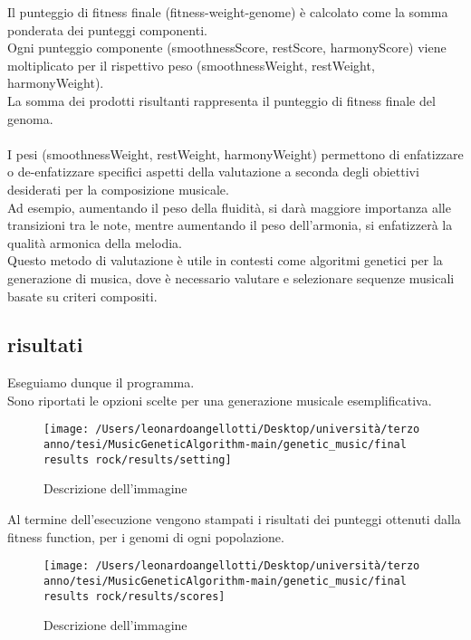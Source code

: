 \documentclass[a4paper,12pt]{report}
\begin{document}
Il punteggio di fitness finale (fitness-weight-genome) è calcolato come la somma ponderata dei punteggi componenti. \\
Ogni punteggio componente (smoothnessScore, restScore, harmonyScore) viene moltiplicato per il rispettivo peso (smoothnessWeight, restWeight, harmonyWeight). \\
La somma dei prodotti risultanti rappresenta il punteggio di fitness finale del genoma. \\
\\
I pesi (smoothnessWeight, restWeight, harmonyWeight) permettono di enfatizzare o de-enfatizzare specifici aspetti della valutazione a seconda degli obiettivi desiderati per la composizione musicale. \\
Ad esempio, aumentando il peso della fluidità, si darà maggiore importanza alle transizioni tra le note, mentre aumentando il peso dell'armonia, si enfatizzerà la qualità armonica della melodia. \\
Questo metodo di valutazione è utile in contesti come algoritmi genetici per la generazione di musica, dove è necessario valutare e selezionare sequenze musicali basate su criteri compositi.

\subsection{risultati}

Eseguiamo dunque il programma. \\
Sono riportati le opzioni scelte per una generazione musicale esemplificativa.

\begin{figure}[h!]
    \centering
    \texttt{[image: /Users/leonardoangellotti/Desktop/università/terzo anno/tesi/MusicGeneticAlgorithm-main/genetic\_music/final results rock/results/setting]} 
    \caption{Descrizione dell'immagine}
    \label{fig:immagine}
\end{figure}

Al termine dell'esecuzione vengono stampati i risultati dei punteggi ottenuti dalla fitness function, per i genomi di ogni popolazione.

\begin{figure}[h!]
    \centering
    \texttt{[image: /Users/leonardoangellotti/Desktop/università/terzo anno/tesi/MusicGeneticAlgorithm-main/genetic\_music/final results rock/results/scores]} 
    \caption{Descrizione dell'immagine}
    \label{fig:immagine}
\end{figure}
\end{document}
